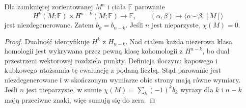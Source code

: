 \begin{wniosek}
\label{cor:pd-parowanie-16}
Dla zamkniętej zorientowanej
$M^n$ i ciała $\mathbb F$
parowanie
\[
 H^k(M;\mathbb F)\times
 H^{n-k}(M;\mathbb F)
 \longrightarrow\mathbb F,\qquad
 (\alpha,\beta)\longmapsto
      \langle\alpha\smile\beta,[M]\rangle
\]
jest niezdegenerowane. Zatem
$b_k=b_{n-k}$. Jeśli $n$
jest nieparzyste, $\chi(M)=0$.
\end{wniosek}
\begin{proof}
Dualność identyfikuje
$H^k$ z $H_{n-k}$.
Nad ciałem każda niezerowa
klasa homologii jest wykrywana
przez pewną klasę kohomologii
z $H^{n-k}$, bo dual przestrzeni
wektorowej rozdziela punkty.
Definicja iloczynu kapowego
i kubkowego utożsamia tę
ewaluację z podaną liczbą.
Stąd parowanie jest
niezdegenerowane i w skończonym
wymiarze obie strony mają
równe wymiary. Jeśli $n$
jest nieparzyste, w sumie
$\chi(M)=\sum_k(-1)^kb_k$
wyrazy dla $k$ i $n-k$
mają przeciwne znaki,
więc sumują się do zera.
\end{proof}

